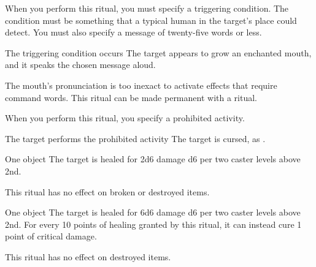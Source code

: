 \spellrng{\rngclose}
\spellspecial When you perform this ritual, you must specify a triggering condition. The condition must be something that a typical human in the target's place could detect. You must also specify a message of twenty-five words or less.
\begin{spelltrigger}{The triggering condition occurs}
    \spelleffect The target appears to grow an enchanted mouth, and it speaks the chosen message aloud.
\end{spelltrigger}
\spellnotes The mouth's pronunciation is too inexact to activate effects that require command words. This ritual can be made permanent with a  ritual.

\spellspecial When you perform this ritual, you specify a prohibited activity.
\begin{spelltrigger}{The target performs the prohibited activity}
    \spelleffect The target is cursed, as .
\end{spelltrigger}
\spellnotes \cursespellnotes
{}

\begin{spelltarget}{One object}
    \spelleffect The target is healed for 2d6 damage \add d6 per two caster levels above 2nd. 
\end{spelltarget}
\spellnotes This ritual has no effect on broken or destroyed items. 

\begin{spelltarget}{One object}
    \spelleffect The target is healed for 6d6 damage \add d6 per two caster levels above 2nd. For every 10 points of healing granted by this ritual, it can instead cure 1 point of critical damage.
\end{spelltarget}
\spellnotes This ritual has no effect on destroyed items.

